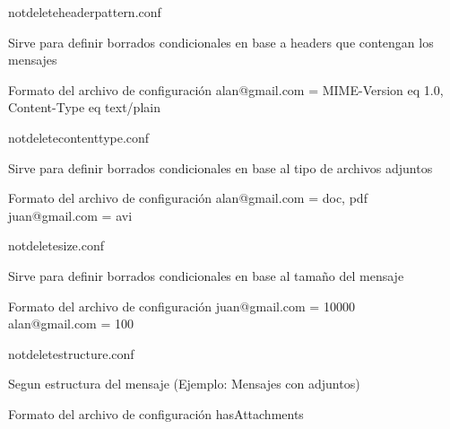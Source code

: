 \documentclass{beamer}
\begin{document}
\begin{frame}{notdelete\textunderscore header\textunderscore pattern.conf}

\par Sirve para definir borrados condicionales en base a headers que contengan los mensajes\\[0.5cm]

\begin{block}{Formato del archivo de configuración}
alan@gmail.com = MIME-Version eq 1.0, Content-Type eq text/plain\\
\end{block}

\end{frame}

\begin{frame}{notdelete\textunderscore contenttype.conf}

\par Sirve para definir borrados condicionales en base al tipo de archivos adjuntos\\[0.5cm]

\begin{block}{Formato del archivo de configuración}
alan@gmail.com = doc, pdf\\
juan@gmail.com = avi\\
\end{block}

\end{frame}

\begin{frame}{notdelete\textunderscore size.conf}

\par Sirve para definir borrados condicionales en base al tamaño del mensaje\\[0.5cm]

\begin{block}{Formato del archivo de configuración}
juan@gmail.com = 10000\\
alan@gmail.com = 100\\
\end{block}

\end{frame}

\begin{frame}{notdelete\textunderscore structure.conf}

\par Segun estructura del mensaje (Ejemplo: Mensajes con adjuntos)\\[0.5cm]

\begin{block}{Formato del archivo de configuración}
hasAttachments\\
\end{block}

\end{frame}
\end{document}
